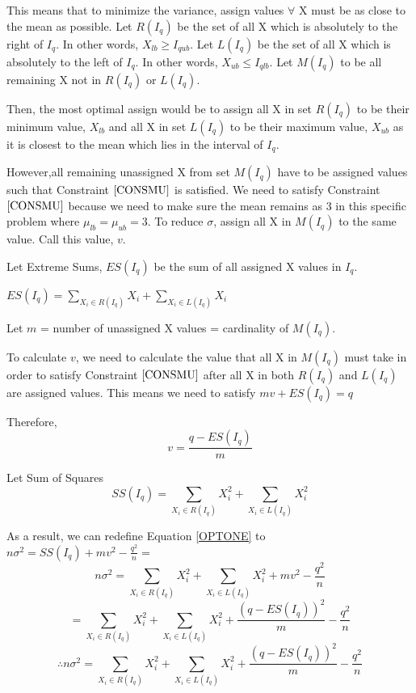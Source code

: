 \documentclass[a4paper,12pt]{article}
\begin{document}
This means that to minimize the variance, assign values $\forall$ X must be as close to the mean as possible. 
Let $R(I_{q})$ be the set of all X which is absolutely to the right of $I_{q}$. 
In other words, $X_{lb} \geq I_{qub}$.
Let $L(I_{q})$ be the set of all X which is absolutely to the left of $I_{q}$. 
In other words, $X_{ub} \leq I_{qlb}$.
Let $M(I_{q})$ to be all remaining X not in $R(I_{q})$ or $L(I_{q})$.

Then, the most optimal assign would be to assign all X in set $R(I_{q})$ to be their minimum value, $X_{lb}$ and all X in set $L(I_{q})$  to be their maximum value, $X_{ub}$ as it is closest to the mean which lies in the interval of $I_{q}$. 

However,all remaining unassigned X from set $M(I_{q})$ have to be assigned values such that Constraint $\ref{CONSMU}$ is satisfied. We need to satisfy Constraint $\ref{CONSMU}$ because we need to make sure the mean remains as 3 in this specific problem where $\mu_{lb} = \mu_{ub} = 3$.  To reduce $\sigma$, assign all X in 
$M(I_{q})$ to the same value. Call this value, $v$. 

Let Extreme Sums, $ES(I_{q})$ be the sum of all assigned X values in $I_{q}$. 

$ES(I_{q}) = \sum_{X_{i} \in R(I_{q})}X_{i} + \sum_{X_{i} \in L(I_{q})}X_{i}$

Let $m$ = number of unassigned X values = cardinality of $M(I_{q})$. 

To calculate $v$, 
we need to calculate the value that all X in $M(I_{q})$ must take in order to satisfy Constraint $\ref{CONSMU}$ after all X in both $R(I_{q})$ and $L(I_{q})$ are assigned values. This means we need to satisfy  $mv + ES(I_{q}) = q $

Therefore, 
\begin{equation}
\label{VAssignment} v = \frac{q - ES(I_{q})}{m}
\end{equation} 

Let Sum of Squares 
\begin{equation}
\label{SUMOFSQUARES}
SS(I_{q}) =  \sum_{X_{i} \in R(I_{q})}X_{i}^2 + \sum_{X_{i} \in L(I_{q})}X_{i}^2
\end{equation} 


As a result, we can redefine Equation \ref{OPTONE} to 
$n\sigma^2 = SS(I_{q}) + mv^2 - \frac{q^2}{n} = $
\begin{equation}
\label{OPTONEA}
 n\sigma^2  = \sum_{X_{i} \in R(I_{q})}X_{i}^2 + \sum_{X_{i} \in L(I_{q})}X_{i}^2 + mv^2 - \frac{q^2}{n}  
\end{equation} 
$$
 = \sum_{X_{i} \in R(I_{q})}X_{i}^2 + \sum_{X_{i} \in L(I_{q})}X_{i}^2 + \frac{(q - ES(I_{q}))^2}{m}  - \frac{q^2}{n}  
$$
\begin{equation}
\label{OPTTWO} \therefore n\sigma^2 = \sum_{X_{i} \in R(I_{q})}X_{i}^2 + \sum_{X_{i} \in L(I_{q})}X_{i}^2 + \frac{(q - ES(I_{q}))^2}{m}  - \frac{q^2}{n} 
\end{equation} 
\end{document}
